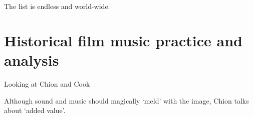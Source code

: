 The list is endless and world-wide. 


\section{Historical film music practice and analysis}

Looking at Chion \citeyearpar{chion1990} and Cook \citeyearpar{cook1998analysing}

Although sound and music should magically `meld' with the image, Chion talks about `added value'. 

